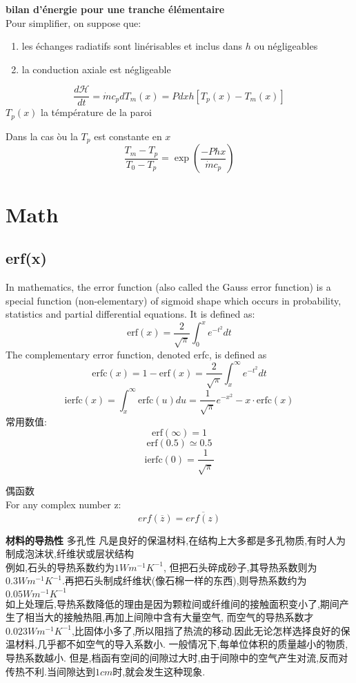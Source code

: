 \documentclass{article}
\begin{document}
\textbf{bilan d'\'energie pour une tranche \'el\'ementaire}\\
Pour simplifier, on suppose que:
\begin{enumerate}
\item les \'echanges radiatifs sont lin\'erisables et inclus dans $h$ ou n\'egligeables
\item la conduction axiale est n\'egligeable
\end{enumerate}

\begin{equation}
\dfrac{d \mathcal{H}}{dt}
= \dot{m} c_p dT_m(x)
= P dx h [T_p(x) - T_m(x)]
\end{equation}
$T_p(x)$ la t\'emp\'erature de la paroi

Dans la cas \`ou la $T_p$ est constante en $x$
$$ \dfrac{T_m - T_p}{T_0 - T_p} = \exp(\dfrac{-Phx}{\dot{m} c_p}) $$

\section{Math}
\subsection{erf(x)}
In mathematics, the error function (also called the Gauss error function) is a special function (non-elementary) of sigmoid shape which occurs in probability, statistics and partial differential equations. It is defined as:
\begin{equation}
 \mbox{erf}(x)=\frac{2}{\sqrt{\pi}}\int_{0}^{x}e^{-t^2}dt
\end{equation}
The complementary error function, denoted erfc, is defined as
\begin{equation}
 \mbox{erfc}(x)=1-\mbox{erf}(x)=\frac{2}{\sqrt{\pi}}\int_{x}^{\infty }e^{-t^2}dt
\end{equation}
$$\mbox{ierfc}(x)=\int_x^{\infty}\mbox{erfc}(u)du=\frac{ 1}{\sqrt{\pi}}e^{-x^2} -  x \cdot \mbox{erfc}(x)$$
常用数值:
$$\mbox{erf}(\infty)=1$$
$$\mbox{erf}(0.5) \simeq 0.5$$
$$\mbox{ierfc}(0)=\frac{ 1}{\sqrt{\pi}}$$

偶函数\\
For any complex number z:
\begin{equation}
 erf(\overline{z})=\overline{erf(z)}
\end{equation}

\textbf{材料的导热性}
多孔性 凡是良好的保温材料,在结构上大多都是多孔物质,有时人为制成泡沫状,纤维状或层状结构 \\
例如,石头的导热系数约为$1Wm^{-1}K^{-1}$, 但把石头碎成砂子,其导热系数则为$0.3Wm^{-1}K^{-1}$.再把石头制成纤维状(像石棉一样的东西),则导热系数约为$0.05Wm^{-1}K^{-1}$ \\
如上处理后,导热系数降低的理由是因为颗粒间或纤维间的接触面积变小了,期间产生了相当大的接触热阻,再加上间隙中含有大量空气,
而空气的导热系数才$0.023Wm^{-1}K^{-1}$,比固体小多了,所以阻挡了热流的移动.因此无论怎样选择良好的保温材料,几乎都不如空气的导入系数小.
一般情况下,每单位体积的质量越小的物质,导热系数越小. 但是,档函有空间的间隙过大时,由于间隙中的空气产生对流,反而对传热不利.当间隙达到$1cm$时,就会发生这种现象.
\end{document}
